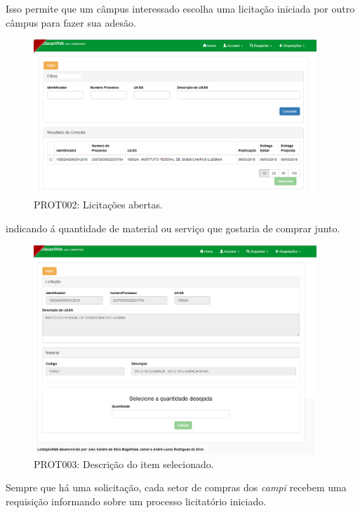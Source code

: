 Isso permite que um câmpus interessado escolha uma licitação iniciada por outro câmpus para fazer sua adesão.

\begin{figure}[H]
	\centering
	\includegraphics[width=0.95\textwidth]{figuras/prototipo002.png}
	\caption[PROT002: Licitações abertas]{PROT002: Licitações abertas.}
\end{figure}

indicando á quantidade de material ou serviço que gostaria de comprar junto.

\begin{figure}[H]
	\centering
	\includegraphics[width=0.95\textwidth]{figuras/prototipo003.png}
	\caption[PROT003: Descrição do item selecionado]{PROT003: Descrição do item selecionado.}
\end{figure}

Sempre que há uma solicitação, cada setor de compras dos \textit{campi} recebem uma requisição informando sobre um processo licitatório iniciado.

